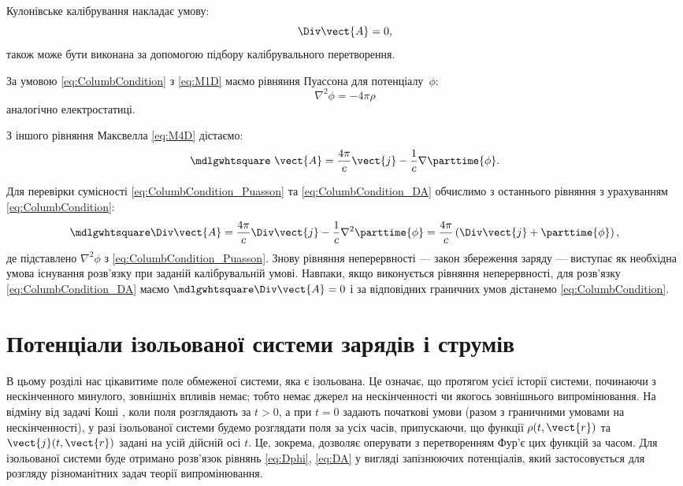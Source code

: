 Кулонівське калібрування накладає умову:
\begin{equation}\label{eq:ColumbCondition}
	\Div \vect{A} = 0,
\end{equation}
також може бути виконана за допомогою підбору калібрувального
перетворення.

За умовою \eqref{eq:ColumbCondition} з \eqref{eq:M1D} маємо рівняння Пуассона для потенціалу~$\phi$:
\begin{equation}\label{eq:ColumbCondition_Puasson}
	\nabla^2 \phi = -4\pi \rho
\end{equation}
аналогічно електростатиці.

З іншого рівняння Максвелла \eqref{eq:M4D} дістаємо:
\begin{equation}\label{eq:ColumbCondition_DA}
	\mdlgwhtsquare\ \vect{A} = \frac{4\pi}c \vect{j} - \frac1c \nabla \parttime{\phi}.
\end{equation}

Для перевірки сумісності \eqref{eq:ColumbCondition_Puasson} та \eqref{eq:ColumbCondition_DA} обчислимо з останнього рівняння з
урахуванням \eqref{eq:ColumbCondition}:
\begin{equation*}
	\mdlgwhtsquare\Div\vect{A} = \frac{4\pi}c \Div\vect{j} - \frac1c \nabla^2 \parttime{\phi} = \frac{4\pi}c\left( \Div\vect{j} +
	\parttime{\phi}\right),
\end{equation*}
де підставлено $\nabla^2\phi$ з \eqref{eq:ColumbCondition_Puasson}. Знову рівняння неперервності --- закон збереження
заряду --- виступає як необхідна умова існування розв’язку при заданій
калібрувальній умові. Навпаки, якщо виконується рівняння неперервності, для
розв’язку \eqref{eq:ColumbCondition_DA} маємо $\mdlgwhtsquare\Div\vect{A} = 0$ і за відповідних граничних умов
дістанемо \eqref{eq:ColumbCondition}.

\section{Потенціали ізольованої системи зарядів і струмів}



В цьому розділі нас цікавитиме поле обмеженої системи, яка є ізольована. Це означає, що протягом усієї історії системи, починаючи з нескінченного
минулого, зовнішніх впливів немає; тобто немає джерел на нескінченності чи якогось зовнішнього випромінювання. На відміну від задачі Коші , коли поля
розглядають за $t >0$, а при $t =0$ задають початкові умови (разом з граничними умовами на нескінченності), у разі ізольованої системи будемо розглядати
поля за усіх часів, припускаючи, що функції $\rho(t, \vect{r})$ та $\vect{j}(t, \vect{r})$ задані на усій дійсній осі $t$. Це, зокрема, дозволяє
оперувати з перетворенням Фур’є цих функцій за часом. Для ізольованої системи буде отримано розв’язок рівнянь \eqref{eq:Dphi}, \eqref{eq:DA} у вигляді
запізнюючих потенціалів, який застосовується для розгляду різноманітних задач теорії випромінювання.



